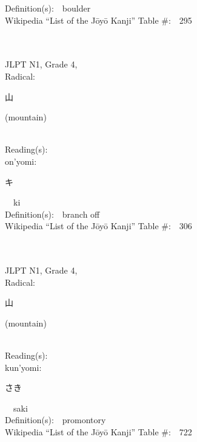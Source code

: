 \begin{multicols}{2}
Definition(s):\ \ boulder \\
Wikipedia ``List of the J\=oy\=o Kanji'' Table \#:\ \ 295 \\
\ \ \\
{\fontsize{34pt}{40pt}  }\ \ \\  %
{JLPT N1, Grade 4, \\Radical:\ \ {\begin{CJK}{UTF8}{min} 山 \end{CJK}} (mountain) } \\
Reading(s):\ \ \\
{\hspace*{1em}}on'yomi:\ \ \\
{\hspace*{2em}}{\begin{CJK}{UTF8}{min} キ \end{CJK}}\ \ ki\ \ \\
Definition(s):\ \ branch off \\
Wikipedia ``List of the J\=oy\=o Kanji'' Table \#:\ \ 306 \\
\ \ \\
{\fontsize{34pt}{40pt}  }\ \ \\  %
{JLPT N1, Grade 4, \\Radical:\ \ {\begin{CJK}{UTF8}{min} 山 \end{CJK}} (mountain) } \\
Reading(s):\ \ \\
{\hspace*{1em}}kun'yomi:\ \ \\
{\hspace*{2em}}{\begin{CJK}{UTF8}{min} さき \end{CJK}}\ \ saki\ \ \\
Definition(s):\ \ promontory \\
Wikipedia ``List of the J\=oy\=o Kanji'' Table \#:\ \ 722 \\
\ \ \\
{\fontsize{34pt}{40pt}  }\ \ \\  %

\end{multicols}
